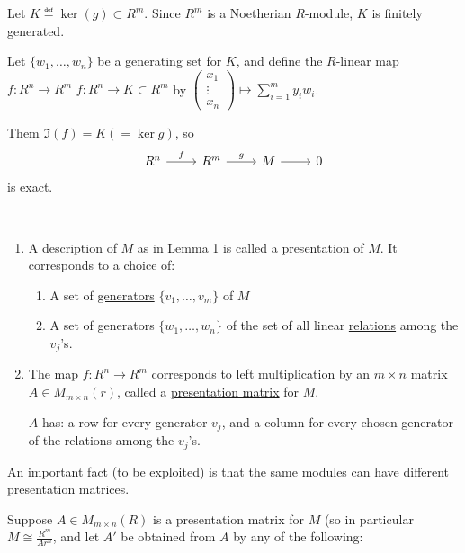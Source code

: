 \documentclass[x11names,reqno,14pt]{extarticle}
\begin{document}
Let $K \eqdef \ker(g) \subset R^m$. Since $R^m$ is a Noetherian $R$-module, $K$ is finitely generated. 

Let $\{w_1, \dots, w_n\}$ be a generating set for $K$, and define the $R$-linear map $f:R^n\to R^m$ $f:R^n\to K\subset R^m$ by $\begin{pmatrix} x_1 \\ \vdots \\ x_n \end{pmatrix} \mapsto \sum_{i=1}^my_iw_i$. 

Them $\Im(f) = K (= \ker g)$, so 
\[
\begin{tikzcd}
R^n\ar[r, "f"]& R^m \ar[r, "g"] & M \ar[r] & 0
\end{tikzcd}
\]
is exact. 

\rem\,

\begin{enumerate}

\item A description of $M$ as in Lemma 1 is called a \underline{presentation of $M$}. It corresponds to a choice of:
\begin{enumerate}[label=(\roman*)] 

\item A set of \underline{generators} $\{v_1, \dots, v_m\}$ of $M$
\item A set of generators $\{w_1, \dots, w_n\}$ of the set of all linear \underline{relations} among the $v_j$'s.

\end{enumerate}

\item The map $f:R^n\to R^m$ corresponds to left multiplication by an $m\times n$ matrix $A \in M_{m\times n}(r)$, called a \underline{presentation matrix} for $M$.

$A$ has: a row for every generator $v_j$, and a column for every chosen generator of the relations among the $v_j$'s. 

\end{enumerate}

An important fact (to be exploited) is that the same modules can have different presentation matrices. 

\lem

Suppose $A \in M_{m\times n}(R)$ is a presentation matrix for $M$ (so in particular $M \cong \frac{R^m}{Ar^n}$, and let $A'$ be obtained from $A$ by any of the following:
\end{document}
